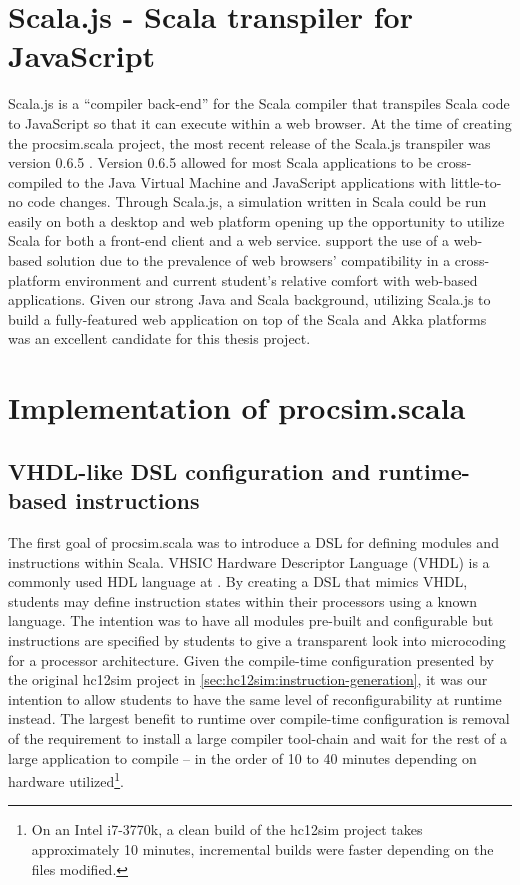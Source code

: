 \section{Scala.js - Scala transpiler for JavaScript}

Scala.js is a ``compiler back-end'' for the Scala compiler that transpiles Scala code to JavaScript so that it can execute within a web browser. At the time of creating the procsim.scala project, the most recent release of the Scala.js transpiler was version 0.6.5 \cite{Scala-js2015}. Version 0.6.5 allowed for most Scala applications to be cross-compiled to the Java Virtual Machine and JavaScript applications with little-to-no code changes. Through Scala.js, a simulation written in Scala could be run easily on both a desktop and web platform opening up the opportunity to utilize Scala for both a front-end client and a web service.  support the use of a web-based solution due to the prevalence of web browsers' compatibility in a cross-platform environment and current student's relative comfort with web-based applications. Given our strong Java and Scala background, utilizing Scala.js to build a fully-featured web application on top of the Scala and Akka platforms was an excellent candidate for this thesis project.

\section{Implementation of procsim.scala}

\subsection{VHDL-like DSL configuration and runtime-based instructions}
\label{sec:sec:procsim-scala:configuration}

The first goal of procsim.scala was to introduce a DSL for defining modules and instructions within Scala. VHSIC Hardware Descriptor Language (VHDL) is a commonly used HDL language at \uwo{}. By creating a DSL that mimics VHDL, students may define instruction states within their processors using a known language. The intention was to have all modules pre-built and configurable but instructions are specified by students to give a transparent look into microcoding for a processor architecture. Given the compile-time configuration presented by the original hc12sim project in \cref{sec:hc12sim:instruction-generation}, it was our intention to allow students to have the same level of reconfigurability at runtime instead. The largest benefit to runtime over compile-time configuration is removal of the requirement to install a large compiler tool-chain and wait for the rest of a large application to compile -- in the order of 10 to 40 minutes depending on hardware utilized\footnote{On an Intel\textregistered{} i7-3770k, a clean build of the hc12sim project takes approximately 10 minutes, incremental builds were faster depending on the files modified.}. 

